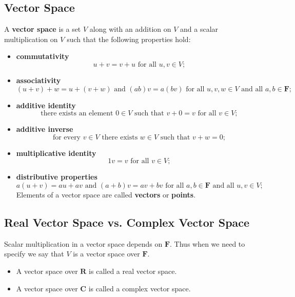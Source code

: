 \documentclass{article}
\begin{document}
	\subsection{Vector Space}
	A \textbf{vector space} is a set $V$ along with an addition on $V$ and a scalar multiplication on $V$ such that the following properties hold:
	\begin{itemize}
		\item \textbf{commutativity}
		\begin{equation*}
			u + v = v + u \text{ for all } u,v\in V;
		\end{equation*}

		\item \textbf{associativity}
		\begin{equation*}
			(u + v) + w = u + (v + w) \text{ and } (ab)v = a(bv) \text{ for all } u,v,w\in V \text{ and all } a,b\in\mathbf{F};
		\end{equation*}

		\item \textbf{additive identity}
		\begin{equation*}
			\text{there exists an element } 0\in V \text{ such that } v + 0 = v \text{ for all } v\in V;
		\end{equation*}

		\item \textbf{additive inverse}
		\begin{equation*}
			\text{for every } v\in V \text{ there exists } w\in V \text{ such that } v + w = 0;
		\end{equation*}

		\item \textbf{multiplicative identity}
		\begin{equation*}
			1v = v\text{ for all } v\in V;
		\end{equation*}

		\item \textbf{distributive properties}
		\begin{equation*}
			a(u + v) = au + av \text{ and } (a + b)v = av + bv \text{ for all } a,b\in \mathbf{F} \text{ and all } u,v\in V;
		\end{equation*}
		Elements of a vector space are called \textbf{vectors} or \textbf{points}.
	\end{itemize}

	\subsection{Real Vector Space vs. Complex Vector Space}
	Scalar multiplication in a vector space depends on $\mathbf{F}$. Thus when we need to specify we say that $V$ is a vector space over $\mathbf{F}$.
	\begin{itemize}
		\item A vector space over $\mathbf{R}$ is called a real vector space.
		\item A vector space over $\mathbf{C}$ is called a complex vector space.
	\end{itemize}
\end{document}
